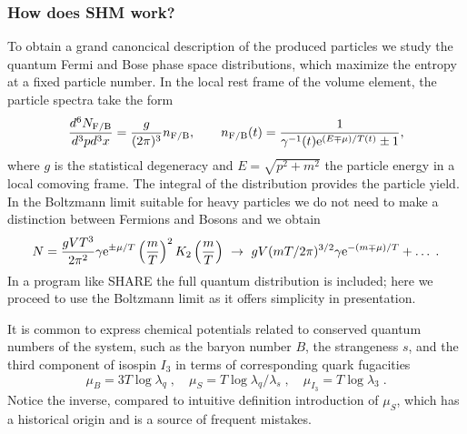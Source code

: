 \subsubsection{How does SHM work?}\label{sec:SHMwork}
To obtain a grand canoncical description of the produced particles we study the quantum Fermi and Bose phase space distributions, which maximize the entropy at a fixed particle number. In the local rest frame of the volume element, the particle spectra take the form 
\begin{equation}\label{eq:fermiDist}
 {{d^6N_\mathrm{F/B}}\over {d^3pd^3x}} = {g\over (2\pi)^3}n_\mathrm{F/B}, \qquad 
n_\mathrm{F/B} (t)= \displaystyle\frac 1 {\gamma^{-1}(t) \mathrm{e}^{(E \mp \mu )/T(t)}\pm 1}, 
\end{equation}
where $g$ is the statistical degeneracy and $E =\sqrt{p^2+m ^2}$ the particle energy in  a local comoving frame. The integral of the distribution  provides the particle yield. In the Boltzmann limit suitable for heavy particles we do not need to make a distinction between Fermions and Bosons and we obtain 
\begin{equation}\label{eq:fermiY}
N = \frac{g V T^3}{2\pi^2} \gamma \mathrm{e}^{\pm\mu/T} \left(\frac{m}{T}\right) ^2 K_2\left(\frac{m}{T}\right) \ \to \ gV (mT/2\pi)^{3/2} \gamma \mathrm{e}^{-(m\mp\mu)/T}+\ldots\;.
\end{equation}
In a program like SHARE the full quantum distribution is included; here we proceed to use the Boltzmann limit as it offers simplicity in presentation.

It is common to express chemical potentials related to conserved quantum numbers of the system, such as the baryon number $B$, the strangeness $s$, and the third component of isospin $I_3$ in terms of corresponding quark fugacities 
\begin{equation}\label{eq:mu}
\mu_B = 3T \log \lambda_q\;, \quad
\mu_S = T \log \lambda_q/\lambda_s\;, \quad
\mu_{I_3} = T \log \lambda_3\;. %
\end{equation} 
Notice the inverse, compared to intuitive definition introduction of $\mu_S$, which has a historical origin and is a source of frequent mistakes. 

